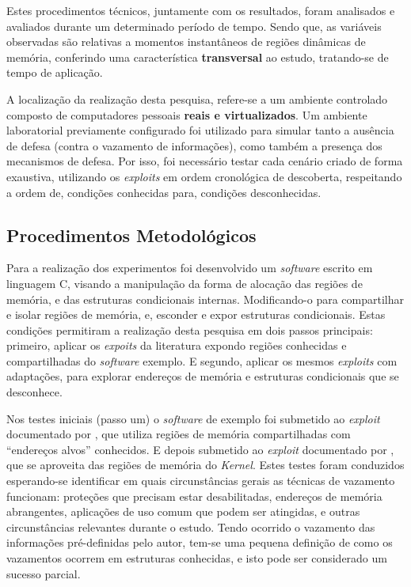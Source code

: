 \documentclass[
	article,			    %
	12pt,				    %
	oneside,			    %
	a4paper,			    %
	chapter=TITLE,		    %
	section=TITLE,		    %
	subsection=TITLE,	    %
	english,			    %
	brazil,				    %
	sumario=tradicional
]{abntex2}
\begin{document}
Estes procedimentos técnicos, juntamente com os resultados, foram analisados e avaliados durante um determinado período de tempo. Sendo que, as variáveis observadas são relativas a momentos instantâneos de regiões dinâmicas de memória, conferindo uma característica \textbf{transversal} ao estudo, tratando-se de tempo de aplicação.

A localização da realização desta pesquisa, refere-se a um ambiente controlado composto de computadores pessoais \textbf{reais e virtualizados}. Um ambiente laboratorial previamente configurado foi utilizado para simular tanto a ausência de defesa (contra o vazamento de informações), como também a presença dos mecanismos de defesa. Por isso, foi necessário testar cada cenário criado de forma exaustiva, utilizando os \emph{exploits} em ordem cronológica de descoberta, respeitando a ordem de, condições conhecidas para, condições desconhecidas.
\subsection{Procedimentos Metodológicos}
Para a realização dos experimentos foi desenvolvido um \emph{software} escrito em linguagem C, visando a manipulação da forma de alocação das regiões de memória, e das estruturas condicionais internas. Modificando-o para compartilhar e isolar regiões de memória, e, esconder e expor estruturas condicionais. Estas condições permitiram a realização desta pesquisa em dois passos principais: primeiro, aplicar os \emph{expoits} da literatura expondo regiões conhecidas e compartilhadas do \emph{software} exemplo. E segundo, aplicar os mesmos \emph{exploits} com adaptações, para explorar endereços de memória e estruturas condicionais que se desconhece.

Nos testes iniciais (passo um) o \emph{software} de exemplo foi submetido ao \emph{exploit} documentado por , que utiliza regiões de memória compartilhadas com ``endereços alvos'' conhecidos. E depois submetido ao \emph{exploit} documentado por , que se aproveita das regiões de memória do \emph{Kernel}. Estes testes foram conduzidos esperando-se identificar em quais circunstâncias gerais as técnicas de vazamento funcionam: proteções que precisam estar desabilitadas, endereços de memória abrangentes, aplicações de uso comum que podem ser atingidas, e outras circunstâncias relevantes durante o estudo. Tendo ocorrido o vazamento das informações pré-definidas pelo autor, tem-se uma pequena definição de como os vazamentos ocorrem em estruturas conhecidas, e isto pode ser considerado um sucesso parcial.
\end{document}
